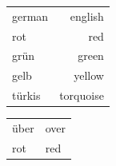 

\begin{center}
  \begin{tabular}{lr}
    german & english \\
    rot    & red \\
    grün   & green \\
    gelb   & yellow \\
    türkis & torquoise \\
  \end{tabular}
\end{center}

\begin{center}
  \begin{tabular}{ll}
    über & over \\
    rot  & red \\
  \end{tabular}
\end{center}


